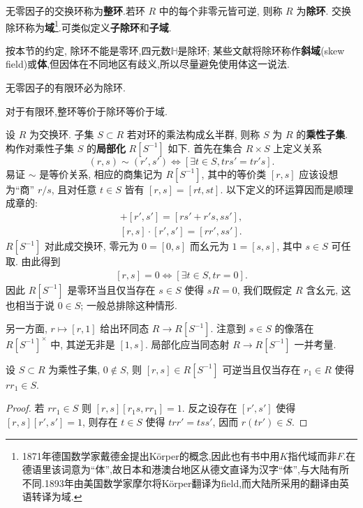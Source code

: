 \begin{definition}\label{def:field}
	无零因子的交换环称为\textbf{整环}.若环 $R$ 中的每个非零元皆可逆, 则称 $R$ 为\textbf{除环}. 交换除环称为\textbf{域}\footnote{1871年德国数学家戴德金提出Körper的概念,因此也有书中用$K$指代域而非$F$.在德语里该词意为``体'',故日本和港澳台地区从德文直译为汉字``体'',与大陆有所不同.1893年由美国数学家摩尔将Körper翻译为field,而大陆所采用的翻译由英语转译为域.}.可类似定义\textbf{子除环}和\textbf{子域}.
\end{definition}
\begin{example}
按本节的约定, 除环不能是零环,四元数$\mathbb{H}$是除环; 某些文献将除环称作\textbf{斜域}(skew field)或\textbf{体},但因体在不同地区有歧义,所以尽量避免使用体这一说法.
\end{example}
\begin{proposition}
	无零因子的有限环必为除环.
\end{proposition}
\begin{theorem}[Wedderburn小定理]
	对于有限环,整环等价于除环等价于域.
\end{theorem}
\begin{definition} 
	设 $R$ 为交换环. 子集 $S \subset R$ 若对环的乘法构成幺半群, 则称 $S$ 为 $R$ 的\textbf{乘性子集}. 构作对乘性子集 $S$ 的\textbf{局部化} $R[S^{-1}]$ 如下. 首先在集合 $R \times S$ 上定义关系
	\[
	(r,s) \sim (r',s') \Leftrightarrow \left[ \exists t \in S, trs' = tr's \right]. 
	\]
	易证 $\sim$ 是等价关系, 相应的商集记为 $R[S^{-1}]$, 其中的等价类 $[r,s]$ 应该设想为``商'' $r/s$, 且对任意 $t \in S$ 皆有 $[r,s]=[rt,st]$. 以下定义的环运算因而是顺理成章的:
	\begin{gather*}
		[r,s] + [r',s'] = [rs' + r's, ss'], \\
		[r,s] \cdot [r',s'] = [rr', ss'].
	\end{gather*}
	$R[S^{-1}]$ 对此成交换环, 零元为 $0 = [0, s]$ 而幺元为 $1 = [s,s]$, 其中 $s \in S$ 可任取. 由此得到
	\begin{gather*}\label{eqn:localization-zero}
		[r,s]=0 \Leftrightarrow \left[ \exists t \in S, tr=0 \right].
	\end{gather*}
	因此 $R[S^{-1}]$ 是零环当且仅当存在 $s \in S$ 使得 $sR=0$, 我们既假定 $R$ 含幺元, 这也相当于说 $0 \in S$; 一般总排除这种情形. 
	
	另一方面, $r \mapsto [r,1]$ 给出环同态 $R \to R[S^{-1}]$. 注意到 $s \in S$ 的像落在 $R[S^{-1}]^\times$ 中, 其逆无非是 $[1,s]$. 局部化应当同态射 $R \to R[S^{-1}]$ 一并考量.
\end{definition}
\begin{lemma}\label{prop:localization-units}
	设 $S \subset R$ 为乘性子集, $0 \notin S$, 则 $[r,s] \in R[S^{-1}]$ 可逆当且仅当存在 $r_1 \in R$ 使得 $rr_1 \in S$.
\end{lemma}
\begin{proof}
	若 $rr_1 \in S$ 则 $[r,s] [r_1 s, rr_1] = 1$. 反之设存在 $[r',s']$ 使得 $[r,s][r',s'] = 1$, 则存在 $t \in S$ 使得 $trr' = tss'$, 因而 $r(tr') \in S$. 
\end{proof}

